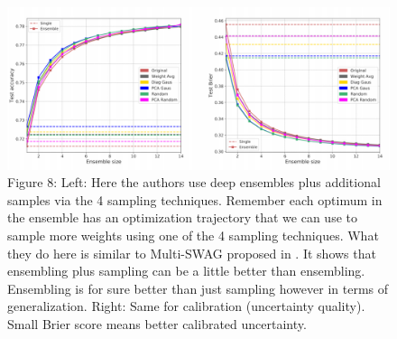 \begin{figure}
	\centering
	\includegraphics[width=1\linewidth]{./Figures/Figure8.png}
	\caption{Figure 8: 
		Left: Here the authors use deep ensembles plus additional samples via the 4 sampling techniques. Remember each optimum in the ensemble has an optimization trajectory that we can use to sample more weights using one of the 4 sampling techniques. What they do here is similar to Multi-SWAG proposed in \textcite{wilson2020bayesian}. It shows that ensembling plus sampling can be a little better than ensembling. Ensembling is for sure better than just sampling however in terms of generalization. Right: Same for calibration (uncertainty quality). Small Brier score means better calibrated uncertainty.}
	\label{}
\end{figure}


\newpage	
\printbibliography[heading=bibintoc,title={References}]
	
